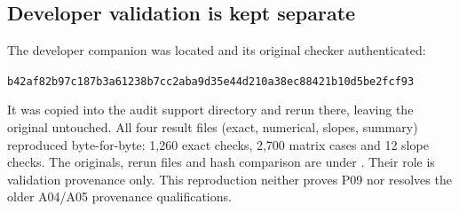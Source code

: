 \documentclass[11pt]{article}
\begin{document}
\subsection{Developer validation is kept separate}
The developer companion was located and its original checker authenticated:
\begin{center}\small
\texttt{b42af82b97c187b3a61238b7cc2aba9d35e44d210a38ec88421b10d5be2fcf93}
\end{center}
It was copied into the audit support directory and rerun there, leaving
the original untouched. All four result files (exact, numerical, slopes,
summary) reproduced byte-for-byte: 1,260 exact checks, 2,700 matrix cases
and 12 slope checks. The originals, rerun files and hash comparison are
under . Their role is validation
provenance only. This reproduction neither proves P09 nor resolves the
older A04/A05 provenance qualifications.
\end{document}
